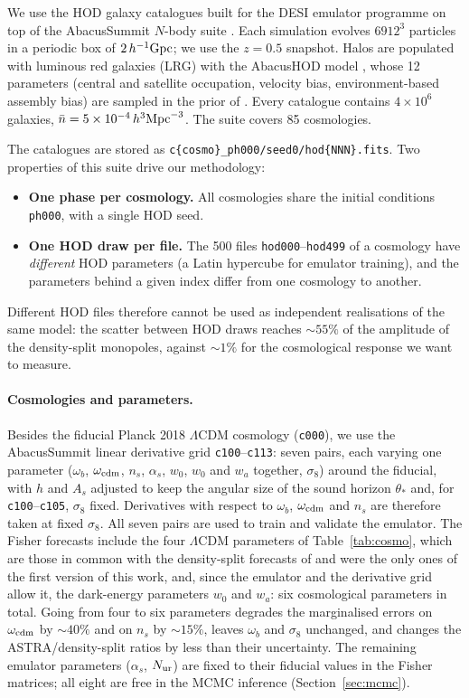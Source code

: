 We use the HOD galaxy catalogues built for the DESI emulator programme on top of the AbacusSummit $N$-body suite \cite{Maksimova2021}. Each simulation evolves $6912^3$ particles in a periodic box of $2\,h^{-1}{\rm Gpc}$; we use the $z=0.5$ snapshot. Halos are populated with luminous red galaxies (LRG) with the AbacusHOD model \cite{Yuan2022}, whose 12 parameters (central and satellite occupation, velocity bias, environment-based assembly bias) are sampled in the prior of \cite{Yuan2023}. Every catalogue contains $4\times10^6$ galaxies, $\bar n = 5\times10^{-4}\,h^3{\rm Mpc}^{-3}$. The suite covers 85 cosmologies.

The catalogues are stored as \texttt{c\{cosmo\}\_ph000/seed0/hod\{NNN\}.fits}. Two properties of this suite drive our methodology:
\begin{itemize}
\item \textbf{One phase per cosmology.} All cosmologies share the initial conditions \texttt{ph000}, with a single HOD seed.
\item \textbf{One HOD draw per file.} The 500 files \texttt{hod000}--\texttt{hod499} of a cosmology have \emph{different} HOD parameters (a Latin hypercube for emulator training), and the parameters behind a given index differ from one cosmology to another.
\end{itemize}
Different HOD files therefore cannot be used as independent realisations of the same model: the scatter between HOD draws reaches $\sim55\%$ of the amplitude of the density-split monopoles, against $\sim1\%$ for the cosmological response we want to measure.

\paragraph{Cosmologies and parameters.} Besides the fiducial Planck 2018 $\Lambda$CDM cosmology (\texttt{c000}), we use the AbacusSummit linear derivative grid \texttt{c100}--\texttt{c113}: seven pairs, each varying one parameter ($\omega_b$, $\omega_{\rm cdm}$, $n_s$, $\alpha_s$, $w_0$, $w_0$ and $w_a$ together, $\sigma_8$) around the fiducial, with $h$ and $A_s$ adjusted to keep the angular size of the sound horizon $\theta_*$ and, for \texttt{c100}--\texttt{c105}, $\sigma_8$ fixed. Derivatives with respect to $\omega_b$, $\omega_{\rm cdm}$ and $n_s$ are therefore taken at fixed $\sigma_8$. All seven pairs are used to train and validate the emulator. The Fisher forecasts include the four $\Lambda$CDM parameters of Table~\ref{tab:cosmo}, which are those in common with the density-split forecasts of \cite{Paillas2023} and were the only ones of the first version of this work, and, since the emulator and the derivative grid allow it, the dark-energy parameters $w_0$ and $w_a$: six cosmological parameters in total. Going from four to six parameters degrades the marginalised errors on $\omega_{\rm cdm}$ by $\sim40\%$ and on $n_s$ by $\sim15\%$, leaves $\omega_b$ and $\sigma_8$ unchanged, and changes the ASTRA/density-split ratios by less than their uncertainty. The remaining emulator parameters ($\alpha_s$, $N_{\rm ur}$) are fixed to their fiducial values in the Fisher matrices; all eight are free in the MCMC inference (Section~\ref{sec:mcmc}).

